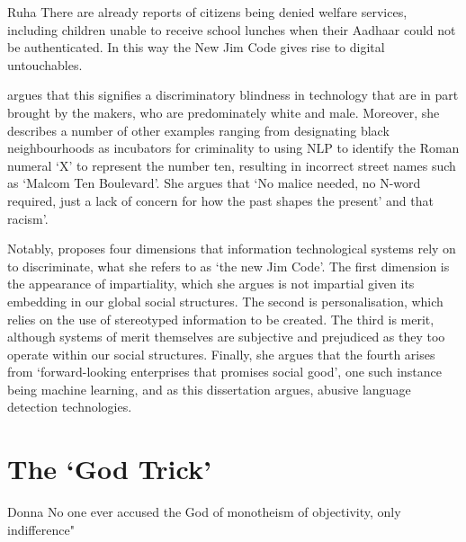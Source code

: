 \begin{citequote}{Ruha \citet[p. 133]{Benjamin:2019}}
  There are already reports of citizens being denied welfare services, including children unable to receive school lunches when their Aadhaar could not be authenticated. In this way the New Jim Code gives rise to digital untouchables.
\end{citequote}

\citet{Benjamin:2019} argues that this signifies a discriminatory blindness in technology that are in part brought by the makers, who are predominately white and male.
Moreover, she describes a number of other examples ranging from designating black neighbourhoods as incubators for criminality to using NLP to identify the Roman numeral `X' to represent the number ten, resulting in incorrect street names such as `Malcom Ten Boulevard'.
She argues that `No malice needed, no N-word required, just a lack of concern for how the past shapes the present' and that racism'.

Notably, \citet{Benjamin:2019} proposes four dimensions that information technological systems rely on to discriminate, what she refers to as `the new Jim Code'.
The first dimension is the appearance of impartiality, which she argues is not impartial given its embedding in our global social structures. 
The second is personalisation, which relies on the use of stereotyped information to be created.
The third is merit, although systems of merit themselves are subjective and prejudiced as they too operate within our social structures.
Finally, she argues that the fourth arises from `forward-looking enterprises that promises social good', one such instance being machine learning, and as this dissertation argues, abusive language detection technologies.

\section{The `God Trick'}

\begin{citequote}{Donna \citet{Haraway:1988}}
  No one ever accused the God of monotheism of objectivity, only indifference"
\end{citequote}


